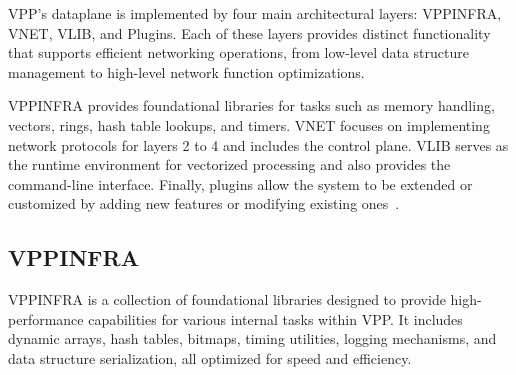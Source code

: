 VPP’s dataplane is implemented by four main architectural layers: VPPINFRA, VNET, VLIB, and Plugins. 
Each of these layers provides distinct functionality that supports efficient networking operations, from low-level data structure management to high-level network function optimizations.

VPPINFRA provides foundational libraries for tasks such as memory handling, vectors, rings, hash table lookups, and timers. 
VNET focuses on implementing network protocols for layers 2 to 4 and includes the control plane. 
VLIB serves as the runtime environment for vectorized processing and also provides the command-line interface. 
Finally, plugins allow the system to be extended or customized by adding new features or modifying existing ones~\cite{fdio-vpp-softwarearchitecture-2506}.

\subsection{VPPINFRA}
VPPINFRA is a collection of foundational libraries designed to provide high-performance capabilities for various internal tasks within VPP. 
It includes dynamic arrays, hash tables, bitmaps, timing utilities, logging mechanisms, and data structure serialization, all optimized for speed and efficiency.

